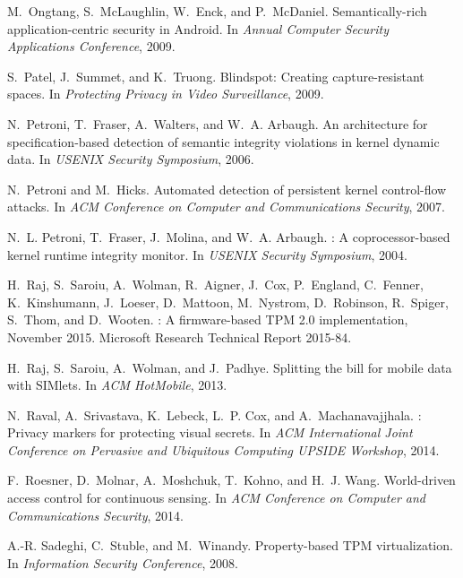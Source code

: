\documentclass[pageno]{sig-alternate-05-2015}
\begin{document}
\begin{thebibliography}{10}
M.~Ongtang, S.~McLaughlin, W.~Enck, and P.~McDaniel.
\newblock Semantically-rich application-centric security in {Android}.
\newblock In {\em Annual Computer Security Applications Conference}, 2009.

S.~Patel, J.~Summet, and K.~Truong.
\newblock Blindspot: Creating capture-resistant spaces.
\newblock In {\em Protecting Privacy in Video Surveillance}, 2009.

N.~Petroni, T.~Fraser, A.~Walters, and W.~A. Arbaugh.
\newblock An architecture for specification-based detection of semantic
  integrity violations in kernel dynamic data.
\newblock In {\em USENIX Security Symposium}, 2006.

N.~Petroni and M.~Hicks.
\newblock Automated detection of persistent kernel control-flow attacks.
\newblock In {\em ACM Conference on Computer and Communications Security},
  2007.

N.~L. Petroni, T.~Fraser, J.~Molina, and W.~A. Arbaugh.
: {A} coprocessor-based kernel runtime integrity monitor.
\newblock In {\em USENIX Security Symposium}, 2004.

H.~Raj, S.~Saroiu, A.~Wolman, R.~Aigner, J.~Cox, P.~England, C.~Fenner,
  K.~Kinshumann, J.~Loeser, D.~Mattoon, M.~Nystrom, D.~Robinson, R.~Spiger,
  S.~Thom, and D.~Wooten.
: {A} firmware-based {TPM} 2.0 implementation, November 2015.
\newblock Microsoft Research Technical Report 2015-84.

H.~Raj, S.~Saroiu, A.~Wolman, and J.~Padhye.
\newblock Splitting the bill for mobile data with {SIM}lets.
\newblock In {\em ACM HotMobile}, 2013.

N.~Raval, A.~Srivastava, K.~Lebeck, L.~P. Cox, and A.~Machanavajjhala.
: {Privacy} markers for protecting visual secrets.
\newblock In {\em ACM International Joint Conference on Pervasive and
  Ubiquitous Computing UPSIDE Workshop}, 2014.

F.~Roesner, D.~Molnar, A.~Moshchuk, T.~Kohno, and H.~J. Wang.
\newblock World-driven access control for continuous sensing.
\newblock In {\em ACM Conference on Computer and Communications Security},
  2014.

A.-R. Sadeghi, C.~Stuble, and M.~Winandy.
\newblock Property-based {TPM} virtualization.
\newblock In {\em Information Security Conference}, 2008.


\end{thebibliography}
\end{document}
